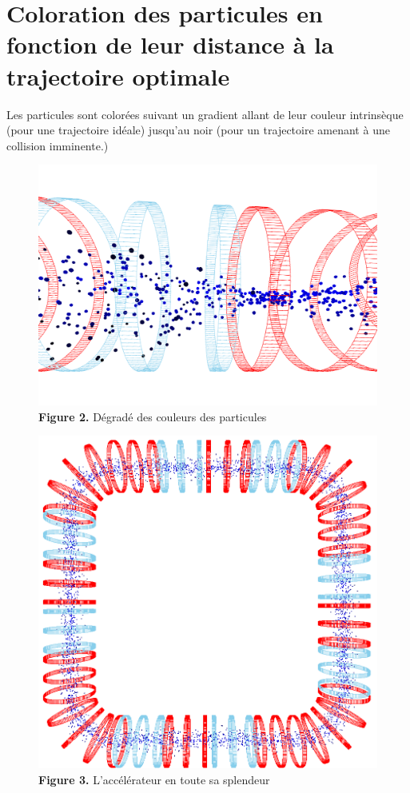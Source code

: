 \documentclass[12pt, letterpaper, twoside]{article}
\begin{document}
\section{Coloration des particules en fonction de leur distance à la trajectoire optimale}
Les particules sont colorées suivant un gradient allant de leur couleur intrinsèque (pour une trajectoire idéale) jusqu'au noir (pour un trajectoire amenant à une collision imminente.)

\begin{figure}
	\centering
	\includegraphics[width=5in]{images/colors.png}
	\caption{\textbf{Figure 2.} Dégradé des couleurs des particules}
\end{figure}

\begin{figure}
	\centering
	\includegraphics[width=5in]{images/accelerator.png}
	\caption{\textbf{Figure 3.} L'accélérateur en toute sa splendeur}
\end{figure}
\end{document}
